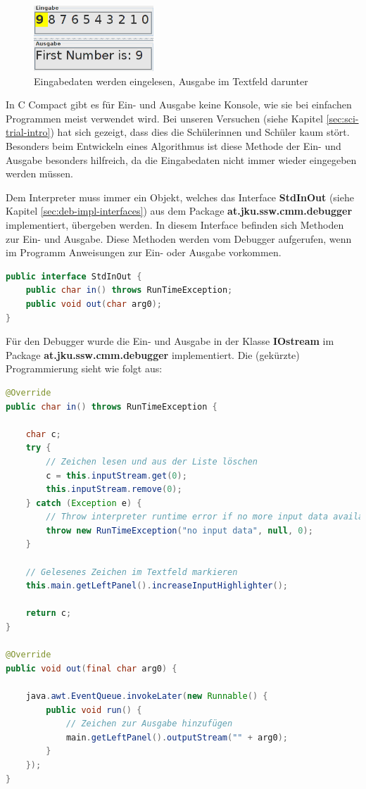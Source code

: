 \begin{figure}[h!] 
  \centering
     \includegraphics[width=0.4\textwidth]{./media/images/gui/main/io.png}
  \caption{Eingabedaten werden eingelesen, Ausgabe im Textfeld darunter}
  \label{fig:gui-main-left-io}
\end{figure}

In C Compact gibt es für Ein- und Ausgabe keine Konsole, wie sie bei einfachen Programmen meist verwendet wird. Bei unseren Versuchen (siehe Kapitel \ref{sec:sci-trial-intro}) hat sich gezeigt, dass dies die Schülerinnen und Schüler kaum stört. Besonders beim Entwickeln eines Algorithmus ist diese Methode der Ein- und Ausgabe besonders hilfreich, da die Eingabedaten nicht immer wieder eingegeben werden müssen.

Dem Interpreter muss immer ein Objekt, welches das Interface \textbf{StdInOut} (siehe Kapitel \ref{sec:deb-impl-interfaces}) aus dem Package \textbf{at.jku.ssw.cmm.debugger} implementiert, übergeben werden. In diesem Interface befinden sich Methoden zur Ein- und Ausgabe. Diese Methoden werden vom Debugger aufgerufen, wenn im Programm Anweisungen zur Ein- oder Ausgabe vorkommen.

\begin{lstlisting}[language=JAVA]
public interface StdInOut {
	public char in() throws RunTimeException;
	public void out(char arg0);
}
\end{lstlisting}

Für den Debugger wurde die Ein- und Ausgabe in der Klasse \textbf{IOstream} im Package \textbf{at.jku.ssw.cmm.debugger} implementiert. Die (gekürzte) Programmierung sieht wie folgt aus:

\begin{lstlisting}[language=JAVA]
@Override
public char in() throws RunTimeException {

	char c;
	try {
		// Zeichen lesen und aus der Liste löschen
		c = this.inputStream.get(0);
		this.inputStream.remove(0);
	} catch (Exception e) {
		// Throw interpreter runtime error if no more input data available
		throw new RunTimeException("no input data", null, 0);
	}
	
	// Gelesenes Zeichen im Textfeld markieren
	this.main.getLeftPanel().increaseInputHighlighter();
	
	return c;
}

@Override
public void out(final char arg0) {

	java.awt.EventQueue.invokeLater(new Runnable() {
		public void run() {
			// Zeichen zur Ausgabe hinzufügen
			main.getLeftPanel().outputStream("" + arg0);
		}
	});
}
\end{lstlisting}

